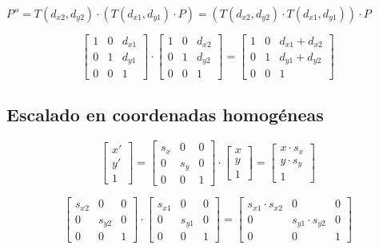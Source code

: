 $P''=T(d_{x2},d_{y2}) \cdot (T(d_{x1},d_{y1}) \cdot P)=(T(d_{x2},d_{y2}) \cdot T(d_{x1},d_{y1})) \cdot P$

$$\left[\begin{matrix}
			1 & 0 & d_{x1} \\ 0 & 1 & d_{y1} \\ 0 & 0 & 1
		\end{matrix}\right] \cdot
	\left[\begin{matrix}
			1 & 0 & d_{x2} \\ 0 & 1 & d_{y2} \\ 0 & 0 & 1
		\end{matrix}\right]=
	\left[\begin{matrix}
			1 & 0 & d_{x1}+d_{x2} \\ 0 & 1 & d_{y1}+d_{y2} \\ 0 & 0 & 1
		\end{matrix}\right]$$

\subsection{Escalado en coordenadas homogéneas}
$$\left[\begin{matrix}
			x' \\ y' \\ 1
		\end{matrix}\right] =
	\left[\begin{matrix}
			s_x & 0 & 0 \\ 0 & s_y & 0 \\ 0 & 0 & 1
		\end{matrix}\right] \cdot
	\left[\begin{matrix}
			x \\ y \\ 1
		\end{matrix}\right]=
	\left[\begin{matrix}
			x\cdot s_x \\ y\cdot s_y \\ 1
		\end{matrix}\right]$$

$$\left[\begin{matrix}
			s_{x2} & 0 & 0 \\ 0 & s_{y2} & 0 \\ 0 & 0 & 1
		\end{matrix}\right] \cdot
	\left[\begin{matrix}
			s_{x1} & 0 & 0 \\ 0 & s_{y1} & 0 \\ 0 & 0 & 1
		\end{matrix}\right]=
	\left[\begin{matrix}
			s_{x1} \cdot s_{x2} & 0 & 0 \\ 0 & s_{y1} \cdot s_{y2} & 0 \\ 0 & 0 & 1
		\end{matrix}\right]$$

